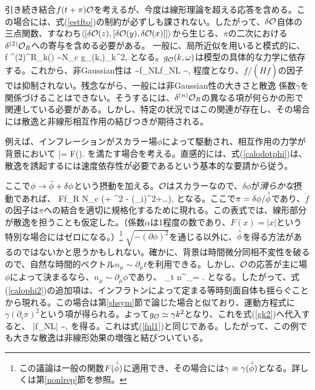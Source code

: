 引き続き結合$f(t+\pi){\cal O}$を考えるが、今度は線形理論を超える応答を含める。この場合には、式(\ref{estfto})の制約が必ずしも課されない。したがって、$\delta{\cal O}$自体の三点関数、すなわち$\langle [\delta{\cal O}(z),[\delta{\cal O}(y),\delta{\cal O}(x)]]\rangle$から生じる、$\pi$の二次における$\delta^{(2)}{\cal O}_R$への寄与を含める必要がある。
一般に、局所近似を用いると模式的に、
\beq
\dot f \delta^{(2)}\calo^R_k(\omega) \sim N_c g_\calo(k,\omega)\pi_k^2,
\eeq
となる。$g_{\cal O}(k,\omega)$は模型の具体的な力学に依存する。これから、非Gaussian性は
\beq
\label{gk2}
 \sim f_{\rm NL}\zeta \to f_{\rm NL} \sim {},
\eeq
程度となり、$\ddot f/(H\dot f)$の因子では抑制されない。残念ながら、一般には非Gaussian性の大きさと散逸
係数$\gamma$を関係づけることはできない。そうするには、$\delta^{(n)} {\cal O}_R$の異なる項が何らかの形で関連している必要がある。しかし、特定の状況ではこの関連が存在し、その場合には散逸と非線形相互作用の結びつきが期待される。
 
例えば、インフレーションがスカラー場$\phi$によって駆動され、相互作用の力学が背景において
\beq
\label{calodotphi}
 \bar\calo = F(\dot\bphi).
\eeq
を満たす場合を考える。直感的には、式(\ref{calodotphi})は、散逸を誘起するには速度依存性が必要であるという基本的な要請から従う。

ここで$\phi \to {\bar\phi} +\delta\phi$という摂動を加える。${\cal O}$はスカラーなので、$\delta\phi$が{\it 滑らかな}摂動であれば、
\beq
\label{calophi2}
 \langle\calo\rangle \simeq F\quad \to\quad \dot f\delta\calo_R \simeq N_c \gamma \left(\dot \pi + \dot\pi^2 - (\partial_i\pi)^2+\ldots\right),
\eeq
となる。ここで$\pi = \delta\phi/\dot{{\bar\phi}}$であり、$\dot f$の因子は$\pi$への結合を適切に規格化するために現れる。この表式では、線形部分が散逸を担うことも仮定した。（係数$\alpha$は1程度の数であり、$F(x)=|x|$という特別な場合にはゼロになる。）\footnote{この議論は一般の関数$F(\dot{{\bar\phi}})$に適用でき、その場合には$\gamma \equiv \gamma(\dot{{\bar\phi}})$となる。詳しくは第\ref{nonlrep}節を参照。}
$\sqrt{-\left(\partial\phi\right)^2}$を通じる以外に、$\dot{{\bar\phi}}$を得る方法があるのではないかと思うかもしれない。確かに、背景は時間微分同相不変性を破るので、自然な時間的ベクトル$n_\mu \sim \partial_\mu t$を利用できる。しかし、${\cal O}$の応答が主に場$\phi$によって決まるなら、$n_\mu \sim \partial_\mu\phi$であり、
\beq \partial_t \phi \to n^\mu \partial_\mu \phi = .\eeq
となる。したがって、式(\ref{calophi2})の追加項は、インフラトンによって定まる等時刻面自体も揺らぐことから現れる。この場合は第\ref{shsym}節で論じた場合と似ており、運動方程式に$\gamma (\partial_i \pi)^2$という項が得られる。よって$g_{\cal O} \simeq \gamma k^2$となり、これを式(\ref{gk2})へ代入すると、
\beq
|f_{\rm NL}| \sim {},
\eeq
を得る。これは式(\ref{fnl1})と同じである。したがって、この例でも大きな散逸は非線形効果の増強と結びついている。\\

